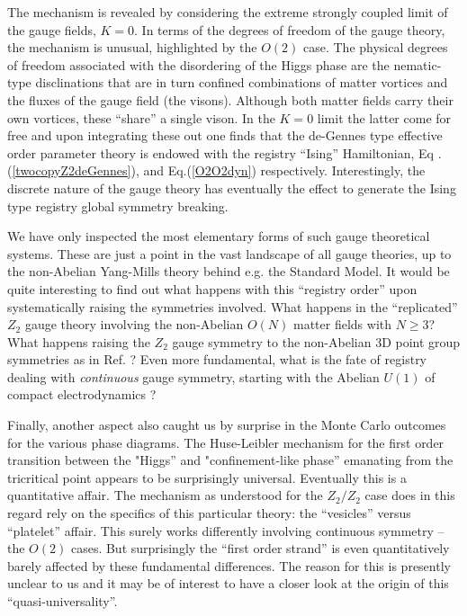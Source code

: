 The mechanism is revealed by considering the extreme strongly coupled limit of the gauge fields, $K=0$. In terms of the degrees of freedom of the gauge theory, the mechanism is unusual, highlighted by the $O(2)$ case. The physical degrees of freedom associated with the disordering of the Higgs phase are the nematic-type disclinations that are in turn confined combinations of matter vortices and the fluxes of the gauge field (the visons). Although both matter fields carry their own vortices, these ``share'' a single vison. In the $K=0$ limit the latter come for free and upon integrating these out one finds that the de-Gennes type effective order parameter theory is endowed with the registry ``Ising'' Hamiltonian, Eq . (\ref{twocopyZ2deGennes}), and Eq.(\ref{O2O2dyn}) respectively. Interestingly, the discrete nature of the gauge theory has eventually the effect to generate the Ising type registry global symmetry breaking. 

We have only inspected the most elementary forms of such gauge theoretical systems. 
These are just a point in the vast landscape of all gauge theories, up to the non-Abelian Yang-Mills theory behind e.g. the Standard Model. It would be quite interesting to find out what happens with this ``registry order'' upon systematically raising the symmetries involved. What happens in the ``replicated''  $Z_2$ gauge theory involving the non-Abelian $O(N)$ matter fields with $N \ge 3$? What happens raising the $Z_2$ gauge symmetry to the non-Abelian 3D point group symmetries as in Ref. \cite{nonabnematic}? Even more fundamental, what is the fate of registry dealing with {\em continuous} gauge symmetry, starting with the Abelian $U(1)$ of compact electrodynamics \cite{PolyakovQED}? 

Finally, another aspect also caught us by surprise in the Monte Carlo outcomes for the various phase diagrams. The Huse-Leibler mechanism for the first order transition between the "Higgs'' and "confinement-like phase'' emanating from the tricritical point appears to be surprisingly universal. Eventually this is a quantitative affair. The mechanism as understood for the $Z_2/Z_2$ case does in this regard rely on the specifics of this particular theory: the ``vesicles'' versus ``platelet'' affair. This surely works differently involving continuous symmetry -- the $O(2)$ cases. But surprisingly the ``first order strand'' is even quantitatively barely affected by these fundamental differences. The reason for this is presently unclear to us and it may be of interest to have a closer look at the origin of this ``quasi-universality''.

